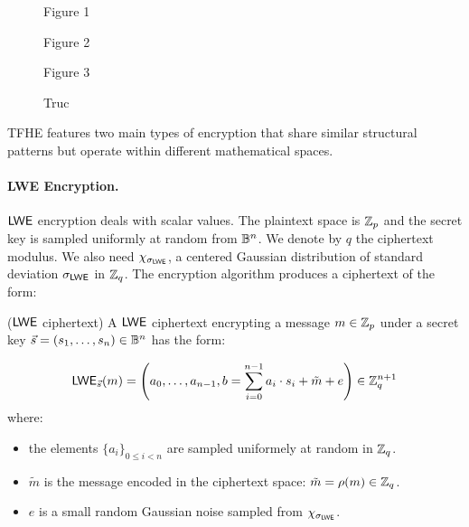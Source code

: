 \begin{figure}[htbp]
	\centering
	\begin{minipage}{0.45\textwidth}
		\centering
		\caption{Figure 1}
	\end{minipage}%
	\hspace{0.05\textwidth} %
	\begin{minipage}{0.45\textwidth}
		\centering
		\caption{Figure 2}
	\end{minipage}
	
	\vspace{0.5cm} %
	\begin{minipage}{0.45\textwidth}
		\centering
		\caption{Figure 3}
	\end{minipage}
	\caption{Truc}
\end{figure}


TFHE features two main types of encryption that share similar structural patterns but operate within different mathematical spaces.


\paragraph{LWE Encryption.}
$\textsf{LWE}$ encryption deals with scalar values. The plaintext space is $\mathbb{Z}_p$ and the secret key is sampled uniformly at random from $\mathbb{B}^n$. We denote by $q$ the ciphertext modulus. We also need 
$\chi_{\sigma_{\textsf{LWE}}}$, a centered Gaussian distribution of standard deviation $\sigma_{\textsf{LWE}}$ in $\mathbb{Z}_q$. The encryption algorithm produces a ciphertext of the form:

\begin{definition}($\textsf{LWE}$ ciphertext)
	A $\textsf{LWE}$ ciphertext encrypting a message $m \in \mathbb{Z}_p$ under a secret key $\vec s=(s_1, \dots, s_n) \in \mathbb{B}^n$ has the form:
	
	\begin{equation}
		\textsf{LWE}_{\vec s}(m) = \left (a_0, \dots, a_{n-1}, b = \sum_{i=0}^{n-1} a_i \cdot s_i + \tilde m + e \right ) \in \mathbb{Z}_q^{n+1}
	\end{equation}
	where:
	\begin{itemize}
		\item the elements $\{a_i\}_{0 \le i < n}$ are sampled uniformely at random in $\mathbb{Z}_q$.
		\item $\tilde m$ is the message encoded in the ciphertext space: $\tilde m = \rho(m) \in \mathbb{Z}_q$.
		\item $e$ is a small random Gaussian noise sampled from $\chi_{\sigma_{\textsf{LWE}}}$.
	\end{itemize}
\end{definition}




